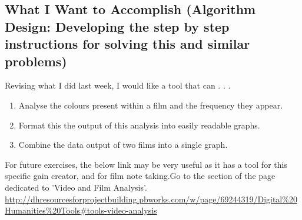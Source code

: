 \documentclass{article}
\begin{document}
\subsection*{What I Want to Accomplish (Algorithm Design: Developing the step by step instructions for solving this and similar problems)}
Revising what I did last week, I would like a tool that can . . .
\begin{enumerate}
\item Analyse the colours present within a film and the frequency they appear.
\item Format this the output of this analysis into easily readable graphs.
\item Combine the data output of two films into a single graph.
\end{enumerate}

\begin{flushleft}
For future exercises, the below link may be very useful as it has a tool for this specific gain creator, and for film note taking.Go to the section of the page dedicated to 'Video and Film Analysis'.\\
\url{http://dhresourcesforprojectbuilding.pbworks.com/w/page/69244319/Digital%20Humanities%20Tools#tools-video-analysis}
\end{flushleft}
\end{document}
